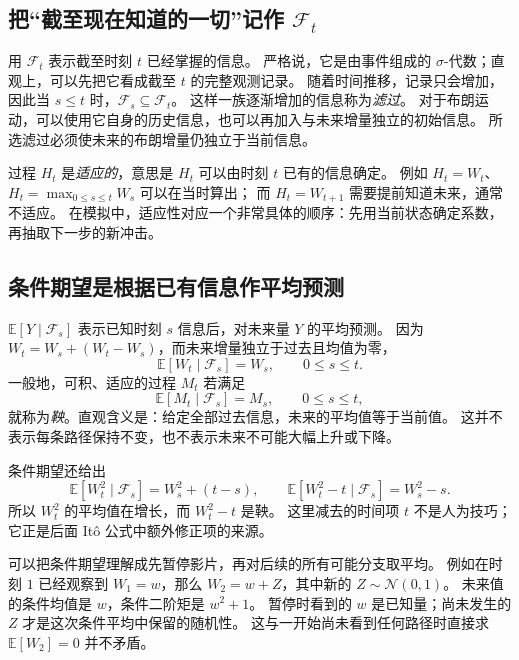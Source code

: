 \documentclass[11pt,a4paper,fontset=none]{ctexart}
\numberwithin{equation}{section}
\newcommand{\E}{\mathbb E}
\begin{document}
\subsection{把“截至现在知道的一切”记作 $\mathcal F_t$}
\label{bg:sub:filtration}

用 $\mathcal F_t$ 表示截至时刻 $t$ 已经掌握的信息。
严格说，它是由事件组成的 $\sigma$-代数；直观上，可以先把它看成截至 $t$ 的完整观测记录。
随着时间推移，记录只会增加，因此当 $s\leq t$ 时，$\mathcal F_s\subseteq\mathcal F_t$。
这样一族逐渐增加的信息称为\emph{滤过}。
对于布朗运动，可以使用它自身的历史信息，也可以再加入与未来增量独立的初始信息。
所选滤过必须使未来的布朗增量仍独立于当前信息。

过程 $H_t$ 是\emph{适应的}，意思是 $H_t$ 可以由时刻 $t$ 已有的信息确定。
例如 $H_t=W_t$、$H_t=\max_{0\leq s\leq t}W_s$ 可以在当时算出；
而 $H_t=W_{t+1}$ 需要提前知道未来，通常不适应。
在模拟中，适应性对应一个非常具体的顺序：先用当前状态确定系数，再抽取下一步的新冲击。

\subsection{条件期望是根据已有信息作平均预测}
\label{bg:sub:martingale}

$\E[Y\mid\mathcal F_s]$ 表示已知时刻 $s$ 信息后，对未来量 $Y$ 的平均预测。
因为 $W_t=W_s+(W_t-W_s)$，而未来增量独立于过去且均值为零，
\begin{equation}
  \E[W_t\mid\mathcal F_s]=W_s,
  \qquad 0\leq s\leq t.
  \label{bg:eq:w-martingale}
\end{equation}
一般地，可积、适应的过程 $M_t$ 若满足
\begin{equation}
  \E[M_t\mid\mathcal F_s]=M_s,
  \qquad 0\leq s\leq t,
  \label{bg:eq:martingale-definition}
\end{equation}
就称为\emph{鞅}。直观含义是：给定全部过去信息，未来的平均值等于当前值。
这并不表示每条路径保持不变，也不表示未来不可能大幅上升或下降。

条件期望还给出
\begin{equation}
  \E[W_t^2\mid\mathcal F_s]=W_s^2+(t-s),
  \qquad
  \E[W_t^2-t\mid\mathcal F_s]=W_s^2-s.
  \label{bg:eq:w-square-martingale}
\end{equation}
所以 $W_t^2$ 的平均值在增长，而 $W_t^2-t$ 是鞅。
这里减去的时间项 $t$ 不是人为技巧；它正是后面 It\^o 公式中额外修正项的来源。

可以把条件期望理解成先暂停影片，再对后续的所有可能分支取平均。
例如在时刻 $1$ 已经观察到 $W_1=w$，那么 $W_2=w+Z$，其中新的 $Z\sim\mathcal N(0,1)$。
未来值的条件均值是 $w$，条件二阶矩是 $w^2+1$。
暂停时看到的 $w$ 是已知量；尚未发生的 $Z$ 才是这次条件平均中保留的随机性。
这与一开始尚未看到任何路径时直接求 $\E[W_2]=0$ 并不矛盾。
\end{document}
